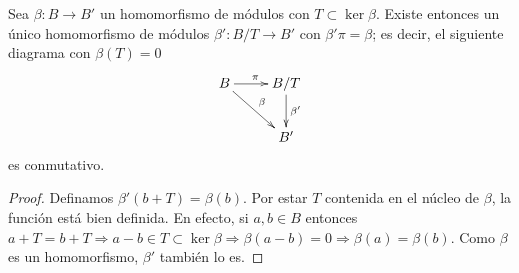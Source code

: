 \begin{proposicion}\label{prop:first_iso}
Sea \( \beta: B \rightarrow B' \) un homomorfismo de módulos con \( T \subset \ker \beta \). Existe entonces un único homomorfismo de módulos \( \beta': B/T \rightarrow B' \) con \( \beta'\pi = \beta \); es decir, el siguiente diagrama con \( \beta(T) = 0 \)
\begin{equation}
    \label{firstisothm}
    \xymatrix{
        B \ar[r]^\pi \ar[dr]^\beta & B/T \ar[d]^{\beta'} \\
        & B'
    }
\end{equation}
es conmutativo.
\end{proposicion}
\begin{proof}
Definamos \( \beta'(b + T) = \beta(b) \). Por estar $T$ contenida en el núcleo de $\beta$, la función está bien definida. En efecto, si $a,b \in B$ entonces $a+T = b+T \Rightarrow a-b \in T \subset \ker \beta \Rightarrow \beta(a-b) = 0 \Rightarrow \beta(a)=\beta(b)$. Como $\beta$ es un homomorfismo, $\beta'$ también lo es.
\end{proof}
%
%
